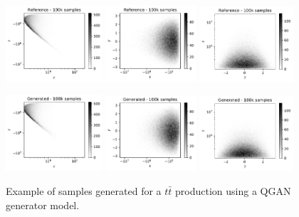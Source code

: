 \documentclass[twocolumn,preprintnumbers,superscriptaddress]{revtex4-2}
\begin{document}
\begin{figure}
  \includegraphics[width=0.32\textwidth]{plots/LHCttbar/s-t_REAL_100k.pdf}%
  \includegraphics[width=0.3\textwidth]{plots/LHCttbar/t-y_REAL_100k.pdf}%
  \includegraphics[width=0.31\textwidth]{plots/LHCttbar/y-s_REAL_100k.pdf}

  \includegraphics[width=0.32\textwidth]{plots/LHCttbar/s-t_FAKE_100k.pdf}%
  \includegraphics[width=0.3\textwidth]{plots/LHCttbar/t-y_FAKE_100k.pdf}%
  \includegraphics[width=0.31\textwidth]{plots/LHCttbar/y-s_FAKE_100k.pdf}

  \caption{\label{fig:3dgauss}Example of samples generated for a $t\bar{t}$
  production using a QGAN generator model.}
\end{figure}
\end{document}
